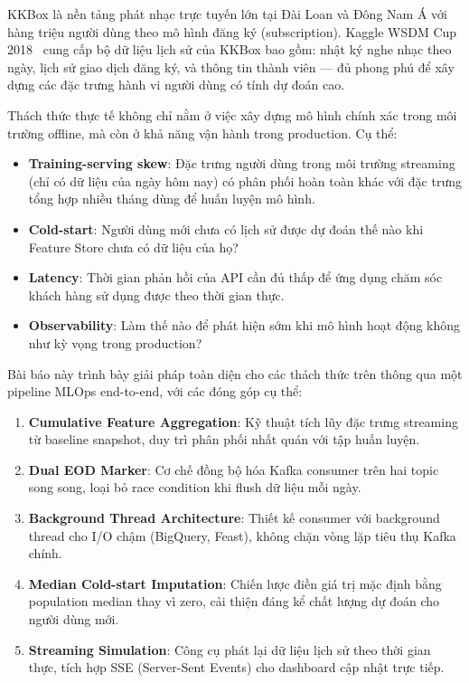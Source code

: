 \documentclass[conference]{IEEEtran}
\begin{document}
KKBox là nền tảng phát nhạc trực tuyến lớn tại Đài Loan và Đông Nam Á với
hàng triệu người dùng theo mô hình đăng ký (subscription). Kaggle WSDM Cup
2018~\cite{wsdm2018} cung cấp bộ dữ liệu lịch sử của KKBox bao gồm: nhật ký
nghe nhạc theo ngày, lịch sử giao dịch đăng ký, và thông tin thành viên —
đủ phong phú để xây dựng các đặc trưng hành vi người dùng có tính dự đoán
cao.

Thách thức thực tế không chỉ nằm ở việc xây dựng mô hình chính xác trong
môi trường offline, mà còn ở khả năng vận hành trong production. Cụ thể:

\begin{itemize}
  \item \textbf{Training-serving skew}: Đặc trưng người dùng trong môi trường
        streaming (chỉ có dữ liệu của ngày hôm nay) có phân phối hoàn toàn
        khác với đặc trưng tổng hợp nhiều tháng dùng để huấn luyện mô hình.
  \item \textbf{Cold-start}: Người dùng mới chưa có lịch sử được dự đoán thế
        nào khi Feature Store chưa có dữ liệu của họ?
  \item \textbf{Latency}: Thời gian phản hồi của API cần đủ thấp để ứng dụng
        chăm sóc khách hàng sử dụng được theo thời gian thực.
  \item \textbf{Observability}: Làm thế nào để phát hiện sớm khi mô hình
        hoạt động không như kỳ vọng trong production?
\end{itemize}

Bài báo này trình bày giải pháp toàn diện cho các thách thức trên thông qua
một pipeline MLOps end-to-end, với các đóng góp cụ thể:

\begin{enumerate}
  \item \textbf{Cumulative Feature Aggregation}: Kỹ thuật tích lũy đặc trưng
        streaming từ baseline snapshot, duy trì phân phối nhất quán với tập
        huấn luyện.
  \item \textbf{Dual EOD Marker}: Cơ chế đồng bộ hóa Kafka consumer trên hai
        topic song song, loại bỏ race condition khi flush dữ liệu mỗi ngày.
  \item \textbf{Background Thread Architecture}: Thiết kế consumer với
        background thread cho I/O chậm (BigQuery, Feast), không chặn vòng lặp
        tiêu thụ Kafka chính.
  \item \textbf{Median Cold-start Imputation}: Chiến lược điền giá trị mặc
        định bằng population median thay vì zero, cải thiện đáng kể chất lượng
        dự đoán cho người dùng mới.
  \item \textbf{Streaming Simulation}: Công cụ phát lại dữ liệu lịch sử
        theo thời gian thực, tích hợp SSE (Server-Sent Events) cho dashboard
        cập nhật trực tiếp.
\end{enumerate}
\end{document}
